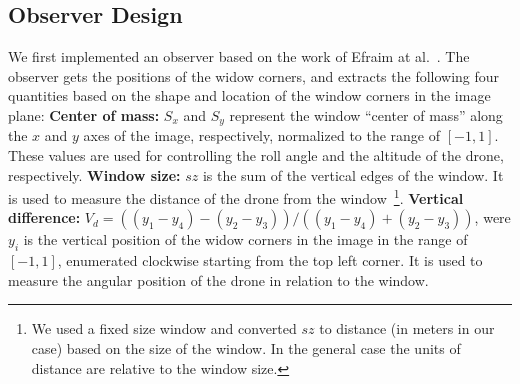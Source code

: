 \documentclass{sig-alternate-ipsn13}
\newtheorem{remark}{Remark}
\begin{document}
\subsection{Observer Design}
\label{sec:Observer Design}
We first implemented an observer based on the work of Efraim at al.~\cite{?? Dynamic Image Based Visual Servo Control of Micro Aerial Vehicles Relative to a Window}. The observer gets the positions of the widow corners, %
and extracts the following four quantities based on the shape and location of the window corners in the image plane: %
\textbf{Center of mass:} $S_x$ and $S_y$ represent the window ``center of mass'' along the $x$ and $y$ axes of the image, respectively, normalized to the range of $[-1,1]$.
These values are used for controlling the roll angle and the altitude of the drone, respectively. 
\textbf{Window size:} $sz$ is the sum of the vertical edges of the window. It is used to measure the distance of the drone from the window~\footnote{We used a fixed size window and converted $sz$ to distance (in meters in our case) based on the size of the window. In the general case the units of distance are relative to the window size.}.
\textbf{Vertical difference:} $V_d = {((y_1-y_4)-(y_2-y_3))}/{((y_1-y_4)+(y_2-y_3))}$, were $y_i$ is the vertical position of the widow corners in the image in the range of $[-1,1]$, enumerated clockwise starting from the top left corner. It is used to measure the angular position of the drone in relation to the window. %

\end{document}
